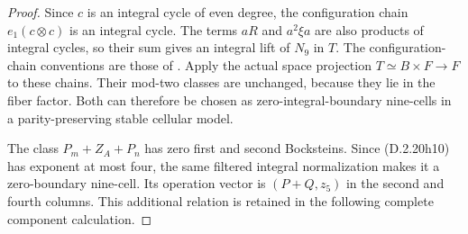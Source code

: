 \begin{proof}
Since $c$ is an integral cycle of even degree,
the configuration chain $e_1(c\otimes c)$ is an
integral cycle. The terms $aR$ and $a^2\xi a$
are also products of integral cycles, so their
sum gives an integral lift of $N_9$ in $T$.
The configuration-chain conventions are those of
\cite[Chapter~III, proof of Lemma~3.10, p.~232]
{I_CohenLadaMay1976}.
Apply the actual space projection $T\simeq B\times F\to F$
to these chains. Their mod-two classes are unchanged,
because they lie in the fiber factor. Both can
therefore be chosen as zero-integral-boundary nine-cells
in a parity-preserving stable cellular model.

The class $P_m+Z_A+P_n$ has zero first and second
Bocksteins. Since \textup{(D.2.20h10)} has exponent
at most four, the same filtered integral normalization
makes it a zero-boundary nine-cell. Its operation
vector is $(P+Q,z_5)$ in the second and fourth columns.
This additional relation is retained in the following
complete component calculation.



\end{proof}
